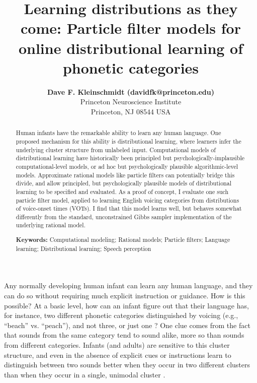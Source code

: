 \documentclass[10pt,letterpaper]{article}
\title{Learning distributions as they come: Particle filter models for online
distributional learning of phonetic categories}
\author{%
    {\large \bf Dave F. Kleinschmidt (davidfk@princeton.edu)} \\
  Princeton Neuroscience Institute\\ Princeton, NJ 08544 USA
  }
\begin{document}
\maketitle


\begin{abstract}
  Human infants have the remarkable ability to learn any human language.
  One proposed mechanism for this ability is distributional learning,
  where learners infer the underlying cluster structure from unlabeled
  input. Computational models of distributional learning have historically
  been principled but psychologically-implausible computational-level
  models, or ad hoc but psychologically plausible algorithmic-level
  models. Approximate rational models like particle filters can
  potentially bridge this divide, and allow principled, but
  psychologically plausible models of distributional learning to be
  specified and evaluated. As a proof of concept, I evaluate one such
  particle filter model, applied to learning English voicing categories
  from distributions of voice-onset times (VOTs). I find that this model
  learns well, but behaves somewhat differently from the standard,
  unconstrained Gibbs sampler implementation of the underlying rational
  model.
  
  \textbf{Keywords:} Computational modeling; Rational models; Particle filters; Language learning; Distributional learning; Speech perception 
\end{abstract}


Any normally developing human infant can learn any human language, and
they can do so without requiring much explicit instruction or guidance.
How is this possible? At a basic level, how can an infant figure out
that their language has, for instance, two different phonetic categories
distinguished by voicing (e.g., \enquote{beach} vs. \enquote{peach}),
and not three, or just one \autocite{Lisker1964}? One clue comes from
the fact that sounds from the same category tend to sound alike, more so
than sounds from different categories. Infants (and adults) are
sensitive to this cluster structure, and even in the absence of explicit
cues or instructions learn to distinguish between two sounds better when
they occur in two different clusters than when they occur in a single,
unimodal cluster \autocite{Maye2002}.
\end{document}
